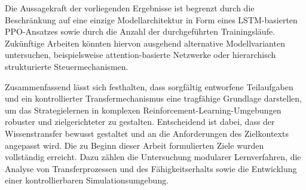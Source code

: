 Die Aussagekraft der vorliegenden Ergebnisse ist begrenzt durch die Beschränkung auf eine einzige Modellarchitektur in Form eines LSTM-basierten PPO-Ansatzes sowie durch die Anzahl der durchgeführten Trainingsläufe. Zukünftige Arbeiten könnten hiervon ausgehend alternative Modellvarianten untersuchen, beispielsweise attention-basierte Netzwerke oder hierarchisch strukturierte Steuermechanismen.

Zusammenfassend lässt sich festhalten, dass sorgfältig entworfene Teilaufgaben und ein kontrollierter Transfermechanismus eine tragfähige Grundlage darstellen, um das Strategielernen in komplexen Reinforcement-Learning-Umgebungen robuster und zielgerichteter zu gestalten. Entscheidend ist dabei, dass der Wissenstransfer bewusst gestaltet und an die Anforderungen des Zielkontexts angepasst wird. Die zu Beginn dieser Arbeit formulierten Ziele wurden vollständig erreicht. Dazu zählen die Untersuchung modularer Lernverfahren, die Analyse von Transferprozessen und des Fähigkeitserhalts sowie die Entwicklung einer kontrollierbaren Simulationsumgebung.
